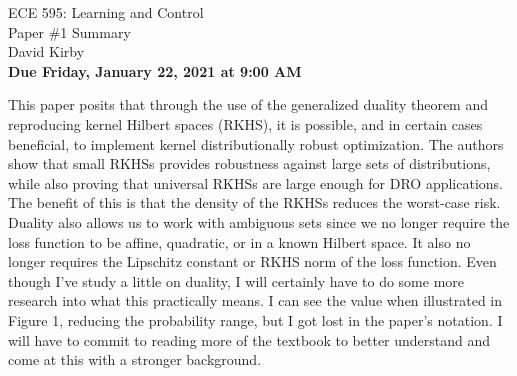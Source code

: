 \documentclass[11pt]{article}
\begin{document}
\begin{center}
\LARGE{ECE 595: Learning and Control\\Paper \#1 Summary}\\[1.5em]
\large David Kirby\\[1.5em]
\large \textbf{Due Friday, January 22, 2021 at 9:00 AM}\\[2.5em]
\end{center}

\noindent This paper posits that through the use of the generalized duality theorem and reproducing kernel Hilbert spaces (RKHS), it is possible, and in certain cases beneficial, to implement kernel distributionally robust optimization. The authors show that small RKHSs provides robustness against large sets of distributions, while also proving that universal RKHSs are large enough for DRO applications. The benefit of this is that the density of the RKHSs reduces the worst-case risk. Duality also allows us to work with ambiguous sets since we no longer require the loss function to be affine, quadratic, or in a known Hilbert space. It also no longer requires the Lipschitz constant or RKHS norm of the loss function. Even though I've study a little on duality, I will certainly have to do some more research into what this practically means. I can see the value when illustrated in Figure 1, reducing the probability range, but I got lost in the paper's notation. I will have to commit to reading more of the textbook to better understand and come at this with a stronger background.
\end{document}
